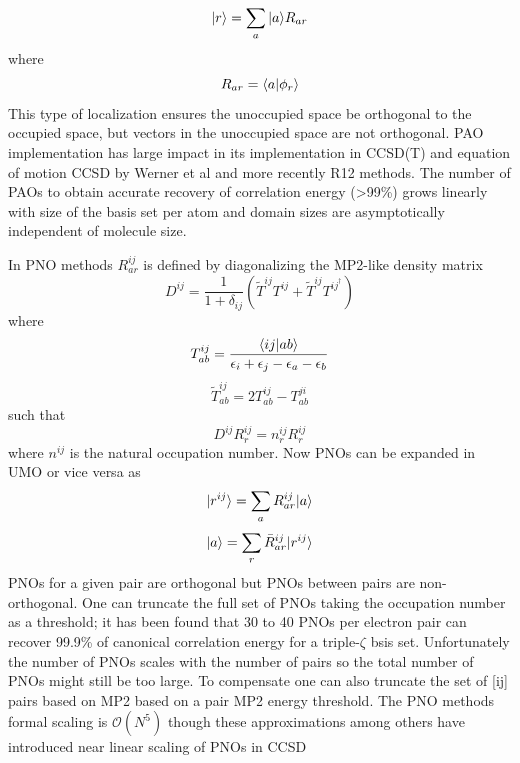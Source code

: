 			\begin{equation}
				| r \rangle = \sum_a | a \rangle R_{ar}
			\end{equation}
		where
				\begin{equation}
					R_{ar} = \langle a|\phi_r\rangle
				\end{equation}
		This type of localization ensures the unoccupied space be orthogonal to the occupied space, but vectors in the unoccupied space are not orthogonal. PAO implementation has large impact in its implementation in CCSD(T) and equation of motion CCSD by Werner et al and more recently R12 methods\cite{Riplinger2013}.  The number of PAOs to obtain accurate recovery of correlation energy (>99\%) grows linearly with size of the basis set per atom and domain sizes are asymptotically independent of molecule size.

		In PNO methods $R^{ij}_{ar}$ is defined by diagonalizing the MP2-like density matrix\cite{yang2012,neese2009}
			\begin{equation}
				D^{ij} = \frac{1}{1+\delta_{ij}}(\tilde{T}^{ij}T^{ij} + \tilde{T}^{ij}T^{ij^\dagger})
			\end{equation}
		where
			\begin{equation}
				T^{ij}_{ab} = \frac{\langle ij|ab\rangle}{\epsilon_i + \epsilon_j - \epsilon_a - \epsilon_b}
			\end{equation}
			\begin{equation}
				\tilde{T}^{ij}_{ab} = 2T^{ij}_{ab} - T^{ji}_{ab}
			\end{equation}
		such that
			\begin{equation}
				D^{ij}R^{ij}_r = n^{ij}_rR^{ij}_r
			\end{equation}
		where $n^{ij}$ is the natural occupation number.  Now PNOs can be expanded in UMO or vice versa as
			\begin{equation}
				| r^{ij} \rangle = \sum_a R^{ij}_{ar} | a \rangle
			\end{equation}
			\begin{equation}
				| a \rangle = \sum_r \bar{R}^{ij}_{ar} | r^{ij} \rangle
			\end{equation}
		PNOs for a given pair are orthogonal but PNOs between pairs are non-orthogonal.  One can truncate the full set of PNOs taking the occupation number as a threshold; it has been found that 30 to 40 PNOs per electron pair can recover 99.9\% of canonical correlation energy for a triple-$\zeta$ bsis set. Unfortunately the number of PNOs scales with the number of pairs so the total number of PNOs might still be too large.  To compensate one can also truncate the set of [ij] pairs based on MP2 based on a pair MP2 energy threshold.  The PNO methods formal scaling is $\mathcal{O}(N^5)$ though these approximations among others have introduced near linear scaling of PNOs in CCSD\cite{Riplinger2013}

